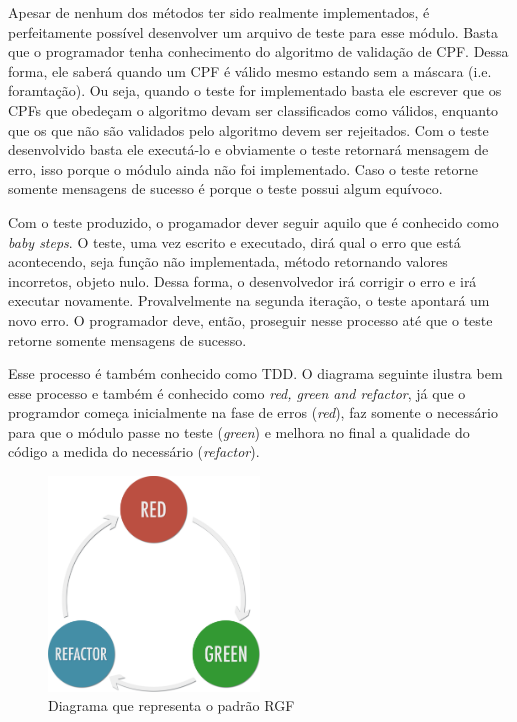 \documentclass[
    12pt,       %
    openright,      %
    twoside,      %
    a4paper,      %
    english,      %
    french,       %
    spanish,      %
    brazil,       %
    ]{abntex2}
\begin{document}
      Apesar de nenhum dos métodos ter sido realmente implementados, é perfeitamente
      possível desenvolver um arquivo de teste para esse módulo. Basta que o programador
      tenha conhecimento do algoritmo de validação de CPF. Dessa forma, ele saberá quando
      um CPF é válido mesmo estando sem a máscara (i.e. foramtação). Ou seja, quando
      o teste for implementado basta ele escrever que os CPFs que obedeçam o algoritmo
      devam ser classificados como válidos, enquanto que os que não são validados pelo
      algoritmo devem ser rejeitados. Com o teste desenvolvido basta ele executá-lo e
      obviamente o teste retornará mensagem de erro, isso porque o módulo ainda não
      foi implementado. Caso o teste retorne somente mensagens de sucesso é porque o
      teste possui algum equívoco.

      Com o teste produzido, o progamador dever seguir aquilo que é conhecido como
      \textit{baby steps}. O teste, uma vez escrito e executado, dirá qual o erro
      que está acontecendo, seja função não implementada, método retornando valores
      incorretos, objeto nulo. Dessa forma, o desenvolvedor irá corrigir o erro e
      irá executar novamente. Provalvelmente na segunda iteração, o teste apontará
      um novo erro. O programador deve, então, proseguir nesse processo até que o
      teste retorne somente mensagens de sucesso.

      Esse processo é também conhecido como TDD. O diagrama seguinte ilustra bem esse
      processo e também é conhecido como \textit{red, green and refactor}, já que o
      programdor começa inicialmente na fase de erros (\textit{red}), faz somente o
      necessário para que o módulo passe no teste (\textit{green}) e melhora no final
      a qualidade do código a medida do necessário (\textit{refactor}).

      \begin{figure}[htbp]
          \begin{center}
              \includegraphics[width=0.5\textwidth]{img/rgf.png}
          \end{center}
          \caption{\label{fig:passaro}Diagrama que representa o padrão RGF}
      \end{figure}
\end{document}
